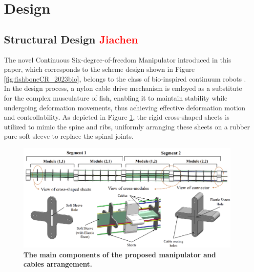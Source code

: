 \section{Design} 
\subsection{Structural Design  \textcolor{red}{Jiachen}}
The novel Continuous Six-degree-of-freedom Manipulator introduced in this paper, which corresponds to the scheme design 
shown in Figure \ref{fig:fishboneCR_2023bio}, belongs to the class of bio-inspired continuum robots \cite{fishboneCR}. 
In the design process, a nylon cable drive mechanism is emloyed as a substitute for the complex musculature of fish, 
enabling it to maintain stability while undergoing deformation movements, thus achieving effective deformation motion 
and controllability. As depicted in Figure \ref{fig:main_components}, the rigid cross-shaped sheets is utilized to mimic 
the spine and ribs, uniformly arranging these sheets on a rubber pure soft sleeve to replace the spinal joints.
\begin{figure}[H] %
    \centering
    \captionsetup{labelsep=colon}
    \includegraphics[width=1.0\textwidth]{Image/Design/main_component_of_manipulator.png} 
    \caption[The main components of the proposed manipulator and cables arrangement]
    {\centering \textbf{The main components of the proposed manipulator and cables arrangement.}}
    \label{fig:main_components}
\end{figure}
